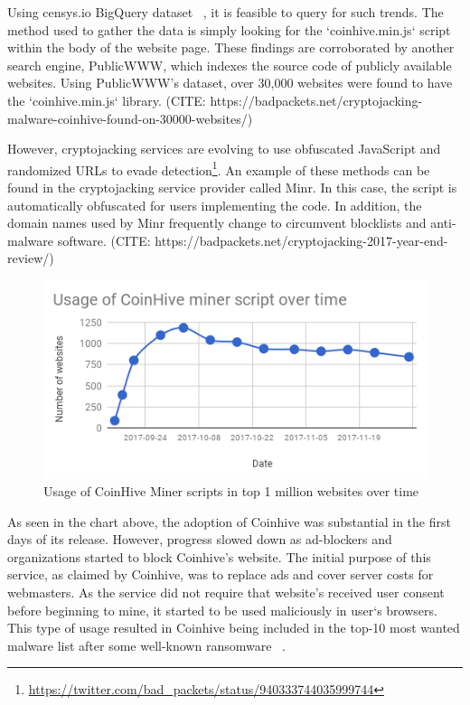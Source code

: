 Using censys.io BigQuery dataset ~\cite{censys15}, it is feasible to query for such trends. The method used to gather the data is simply looking for the `coinhive.min.js` script within the body of the website page. These findings are corroborated by another search engine, PublicWWW, which indexes the source code of publicly available websites. Using PublicWWW's dataset, over 30,000 websites were found to have the `coinhive.min.js` library. (CITE: https://badpackets.net/cryptojacking-malware-coinhive-found-on-30000-websites/)

However, cryptojacking services are evolving to use obfuscated JavaScript and randomized URLs to evade detection\footnote{\url{https://twitter.com/bad_packets/status/940333744035999744}}. An example of these methods can be found in the cryptojacking service provider called Minr. In this case, the script is automatically obfuscated for users implementing the code. In addition, the domain names used by Minr frequently change to circumvent blocklists and anti-malware software. (CITE: https://badpackets.net/cryptojacking-2017-year-end-review/)

\begin{figure}[t]
\centering
\includegraphics[width=\linewidth]{figures/usage_of_coinhive_over_time.png}
\caption{Usage of CoinHive Miner scripts in top 1 million websites over time}
\end{figure}


As seen in the chart above, the adoption of Coinhive was substantial in the first days of its release. However, progress slowed down as ad-blockers and organizations started to block Coinhive's website. The initial purpose of this service, as claimed by Coinhive, was to replace ads and cover server costs for webmasters. As the service did not require that website's received user consent before beginning to mine, it started to be used maliciously in user`s browsers. This type of usage resulted in Coinhive being included in the top-10 most wanted malware list after some well-known ransomware ~\cite{checkpoint}. 

